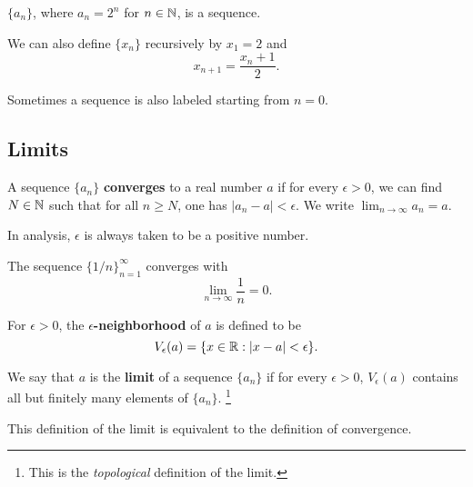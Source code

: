 \begin{example}
  $\{a_n\}$, where $a_n = 2^n$ for $n \in \mathbb{N}$, is a sequence.
\end{example}

\begin{example}
  We can also define $\{x_n\}$ recursively by $x_1 = 2$
  and
  \[
    x_{n+1} = \frac{x_n + 1}{2}
  .\]
\end{example}

\begin{remark}
  Sometimes a sequence is also labeled starting from
  $n = 0$.
\end{remark}

\subsection{Limits}
\begin{definition}
  A sequence $\{a_n\}$ \textbf{converges} to a real number
  $a$ if for every $\epsilon > 0$, we can find $N \in \mathbb{N}$
  such that for all $n \ge N$, one has
  $|a_n - a| < \epsilon$.
  We write $\lim_{n \to \infty} a_n = a$.
\end{definition}

\begin{remark}
  In analysis, $\epsilon$ is always taken to be a
  positive number.
\end{remark}

\begin{example}
  The sequence $\{1/n\}_{n = 1}^\infty$ converges with
  \[\lim_{n \to \infty} \frac{1}{n} = 0.\]
\end{example}

\begin{definition}
  For $\epsilon > 0$, the
  \textbf{$\epsilon$-neighborhood} of $a$
  is defined to be
  \[V_\epsilon(a) = \{x \in \mathbb{R} : |x - a| < \epsilon\}.\]
\end{definition}

\begin{definition}
  We say that $a$ is the \textbf{limit} of a sequence
  $\{a_n\}$ if for every $\epsilon > 0$,
  $V_\epsilon(a)$ contains all but finitely
  many elements of $\{a_n\}$.
  \footnote{This is the \textit{topological} definition
    of the limit.}
\end{definition}

\begin{remark}
  This definition of the limit is equivalent to the
  definition of convergence.
\end{remark}

